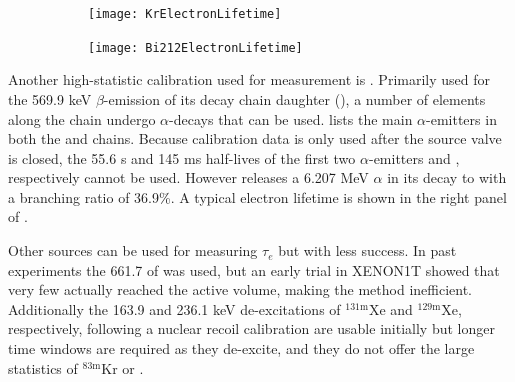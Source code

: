 \begin{figure}
    \centering
    \begin{subfigure}[t]{0.45\textwidth}
        \centering
        \texttt{[image: KrElectronLifetime]}
    \end{subfigure}%
    \begin{subfigure}[t]{0.45\textwidth}
        \centering
        \texttt{[image: Bi212ElectronLifetime]}
    \end{subfigure}
    \caption{}
	\label{fig:calibrations_elifetime}
\end{figure}

Another high-statistic calibration used for measurement is .  Primarily used for the 569.9 keV $\beta$-emission of its
decay chain daughter  (), a number of elements along the chain
undergo $\alpha$-decays that can be
used.   lists the main $\alpha$-emitters in both the  and  chains.  Because calibration
data is only used after the source valve is closed, the 55.6 s and 145 ms half-lives of the first two $\alpha$-emitters  and
, respectively cannot be used.  However  releases a 6.207 MeV $\alpha$ in its decay to  with a
branching ratio of 36.9\%.  A typical electron lifetime is shown in the right panel of .

Other sources can be used for measuring $\tau_e$ but with less success.  In past experiments the 661.7 \gammaray of  was
used, but an early trial in XENON1T showed that very few actually reached the active volume, making the method inefficient.  Additionally
the 163.9 and 236.1 keV de-excitations of $\mathrm{^{131m}Xe}$ and $\mathrm{^{129m}Xe}$, respectively, following a nuclear recoil calibration are
usable initially but longer time windows are required as they de-excite, and they do not offer the large statistics of $\mathrm{^{83m}Kr}$
or .

